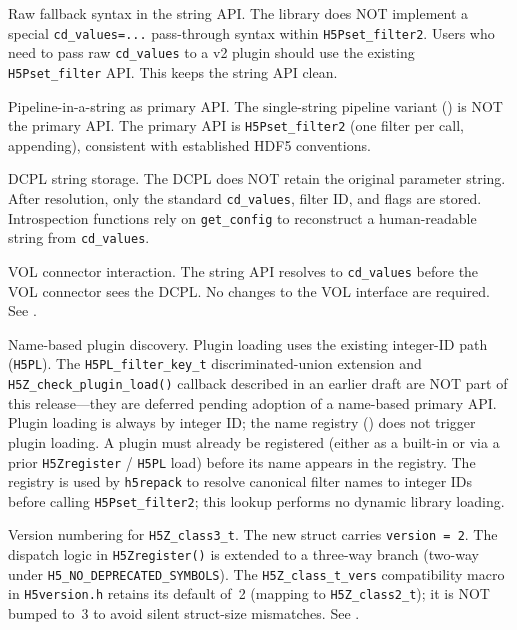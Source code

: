 \documentclass[../RFC-HDFG-2026-001.tex]{subfiles}
\begin{document}
Raw fallback syntax in the string API. The library does NOT implement a
special \texttt{cd\_values=...} pass-through syntax within
\texttt{H5Pset\_filter2}. Users who need to pass raw \texttt{cd\_values} to a v2
plugin should use the existing \texttt{H5Pset\_filter} API. This keeps the string
API clean.

Pipeline-in-a-string as primary API. The single-string pipeline
variant () is NOT the primary API. The primary
API is \texttt{H5Pset\_filter2} (one filter per call, appending), consistent
with established HDF5 conventions.

DCPL string storage. The DCPL does NOT retain the original parameter
string. After resolution, only the standard \texttt{cd\_values}, filter ID, and flags
are stored. Introspection functions rely on \texttt{get\_config} to reconstruct a
human-readable string from \texttt{cd\_values}.

VOL connector interaction. The string API resolves to \texttt{cd\_values}
before the VOL connector sees the DCPL. No changes to the VOL interface are
required. See .

Name-based plugin discovery. Plugin loading uses the existing integer-ID
path (\texttt{H5PL}). The \texttt{H5PL\_filter\_key\_t} discriminated-union extension and
\texttt{H5Z\_check\_plugin\_load()} callback described in an earlier draft are NOT
part of this release---they are deferred pending adoption of a name-based
primary API. Plugin loading is always by integer ID; the name registry
() does not trigger plugin loading.  A plugin
must already be registered (either as a built-in or via a prior
\texttt{H5Zregister} / \texttt{H5PL} load) before its name appears in the
registry.  The registry is used by \texttt{h5repack} to resolve canonical
filter names to integer IDs before calling \texttt{H5Pset\_filter2}; this
lookup performs no dynamic library loading.

Version numbering for \texttt{H5Z\_class3\_t}. The new struct carries
\texttt{version = 2}. The dispatch logic in \texttt{H5Zregister()} is extended to a
three-way branch (two-way under \texttt{H5\_NO\_DEPRECATED\_SYMBOLS}). The
\texttt{H5Z\_class\_t\_vers} compatibility macro in \texttt{H5version.h} retains its default
of~2 (mapping to \texttt{H5Z\_class2\_t}); it is NOT bumped to~3 to avoid silent
struct-size mismatches. See .
\end{document}
